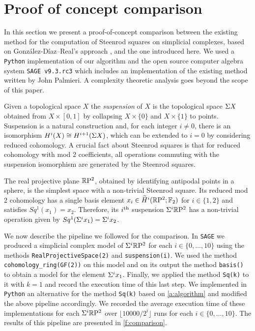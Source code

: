 
\section{Proof of concept comparison} \label{s:comparison}

In this section we present a proof-of-concept comparison between the existing method for the computation of Steenrod squares on simplicial complexes, based on Gonz\'alez-D\'iaz--Real's approach \cite[Corollary 3.2]{gonzalez-diaz1999steenrod}, and the one introduced here.
We used a \verb|Python| implementation of our algorithm and the open source computer algebra system \verb|SAGE v9.3.rc3| \cite{sagemath} which includes an implementation of the existing method written by John Palmieri.
A complexity theoretic analysis goes beyond the scope of this paper.

Given a topological space $X$ the \textit{suspension} of $X$ is the topological space $\Sigma X$ obtained from $X \times [0,1]$ by collapsing $X \times \{0\}$ and $X \times \{1\}$ to points.
Suspension is a natural construction and, for each integer $i \neq 0$, there is an isomorphism $H^i(X) \cong H^{i+1}(\Sigma X)$, which can be extended to $i = 0$ by considering reduced cohomology.
A crucial fact about Steenrod squares is that for reduced cohomology with mod 2 coefficients, all operations commuting with the suspension isomorphism are generated by the Steenrod squares.

The real projective plane $\mathbb{R}\mathrm{P}^2$, obtained by identifying antipodal points in a sphere, is the simplest space with a non-trivial Steenrod square.
Its reduced mod 2 cohomology has a single basis element $x_i \in \widetilde{H}^i(\mathbb{R}\mathrm{P}^2; {\mathbb{F}_2})$ for $i \in \{1, 2\}$ and satisfies $Sq^1(x_1) = x_2$.
Therefore, its $i^{\mathrm{th}}$ suspension $\Sigma^i \mathbb{R}\mathrm{P}^2$ has a non-trivial operation given by $Sq^1(\Sigma^i x_1) = \Sigma^i x_2$.

We now describe the pipeline we followed for the comparison.
In \verb|SAGE| we produced a simplicial complex model of $\Sigma^i \mathbb{R}\mathrm{P}^2$ for each $i \in \{0, \dots, 10\}$ using the methods \verb|RealProjectiveSpace(2)| and \verb|suspension(i)|.
We used the method \verb|cohomology_ring(GF(2))| on this model and on its output the method \verb|basis()| to obtain a model for the element $\Sigma^i x_1$.
Finally, we applied the method \verb|Sq(k)| to it with $k=1$ and record the execution time of this last step.
We implemented in \verb|Python| an alternative for the method \verb|Sq(k)| based on \cref{a:algorithm} and modified the above pipeline accordingly.
We recorded the average execution time of these implementations for each $\Sigma^i \mathbb{R}\mathrm{P}^2$ over $\lfloor 10000/2^i \rfloor$ runs for each $i \in \{0, \dots, 10\}$.
The results of this pipeline are presented in \cref{f:comparison}.

